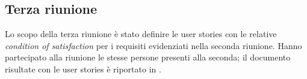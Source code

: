 \subsection{Terza riunione}
\label{sec:terza-riunione}

Lo scopo della terza riunione è stato definire le user stories con le relative \emph{condition of satisfaction} per i requisiti evidenziati nella seconda riunione.
Hanno partecipato alla riunione le stesse persone presenti alla seconda; il documento risultate con le user stories è riportato in .
